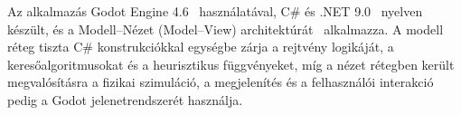 Az alkalmazás Godot Engine 4.6~\cite{godot_engine} használatával, C\# és .NET 9.0~\cite{dotnet9} nyelven készült, és a Modell--Nézet (Model--View) architektúrát~\cite{krasner1988mvc} alkalmazza. A modell réteg tiszta C\# konstrukciókkal egységbe zárja a rejtvény logikáját, a keresőalgoritmusokat és a heurisztikus függvényeket, míg a nézet rétegben került megvalósításra a fizikai szimuláció, a megjelenítés és a felhasználói interakció pedig a Godot jelenetrendszerét használja.

